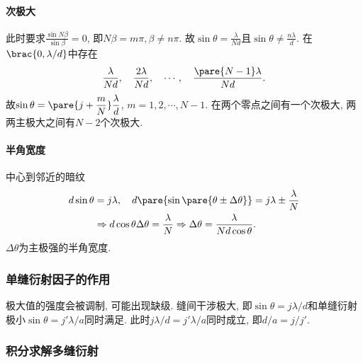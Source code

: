 \documentclass{ctexart}
\begin{document}

\paragraph{次极大} %
\label{par:次极大}

此时要求$\displaystyle \frac{\sin N\beta}{\sin \beta} = 0$, 即$N\beta = m\pi, \beta \neq n\pi$. 故$\sin\theta = \displaystyle \frac{\lambda}{Nd}$且$\sin\theta \neq \frac{n\lambda}{d}$. 在$\brac{0,\lambda / d}$中存在
\[ \frac{\lambda}{Nd},\quad \frac{2\lambda}{Nd},\quad \cdots,\quad \frac{\pare{N-1}\lambda}{Nd}. \]
故$\displaystyle \sin\theta = \pare{j + \frac{m}{N}} \frac{\lambda}{d}$, $m = 1,2,\cdots,N-1$. 在两个零点之间有一个次极大, 两两主极大之间有$N-2$个次极大.


\paragraph{半角宽度} %
\label{par:半角宽度}

中心到邻近的暗纹
\begin{align*}
    d\sin\theta &= j\lambda,\quad d\pare{\sin\pare{\theta \pm \Delta\theta}} = j\lambda \pm \frac{\lambda}{N}\\ &\Rightarrow d\cos\theta\Delta\theta = \frac{\lambda}{N}\Rightarrow \Delta\theta = \frac{\lambda}{Nd\cos\theta}.
\end{align*}
$\Delta\theta$为主极强的半角宽度.


\subsubsection{单缝衍射因子的作用} %
\label{ssub:单缝衍射因子的作用}

极大值的强度会被调制, 可能出现缺级. 缝间干涉极大, 即$\displaystyle \sin\theta = j\lambda/d$和单缝衍射极小$\sin\theta = j'\lambda/a$同时满足. 此时$j\lambda / d = j'\lambda / a$同时成立, 即$d/a = j/j'$.


\subsubsection{积分求解多缝衍射} %
\label{ssub:积分求解多缝衍射}
\end{document}

